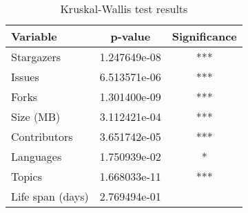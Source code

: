 \begin{table}
\centering
\caption{Kruskal-Wallis test results}
\label{tab:kruskal_wallis}
\begin{tabular}{lcc}
\toprule
        Variable &      p-value & Significance \\
\midrule
      Stargazers & 1.247649e-08 &          *** \\
          Issues & 6.513571e-06 &          *** \\
           Forks & 1.301400e-09 &          *** \\
       Size (MB) & 3.112421e-04 &          *** \\
    Contributors & 3.651742e-05 &          *** \\
       Languages & 1.750939e-02 &            * \\
          Topics & 1.668033e-11 &          *** \\
Life span (days) & 2.769494e-01 &              \\
\bottomrule
\end{tabular}
\end{table}
